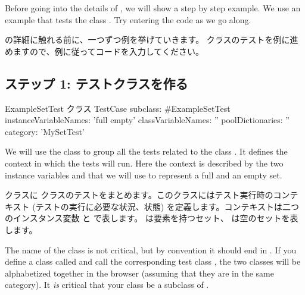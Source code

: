 \documentclass[a4paper,10pt,twoside]{book}
\begin{document}
Before going into the details of \SUnit, we will show a step by step
example.  We use an example that tests the class .  Try
entering the code as we go along.

\SUnit の詳細に触れる前に、一つずつ例を挙げていきます。  クラスのテストを例に進めますので、例に従ってコードを入力してください。

\subsection{ステップ 1: テストクラスを作る}

\fi


\begin{classdef}[exampleSetTest]{ExampleSetTest クラス}
TestCase subclass: #ExampleSetTest
	instanceVariableNames: 'full empty'
	classVariableNames: ''
	poolDictionaries: ''
	category: 'MySetTest'
\end{classdef}

We will use the class  to group all the tests related to
the class .  It defines the context in which the tests
will run.  Here the context is described by
the two instance variables  and 
that we will use to represent a full and an empty set.
\fi

 クラスに  クラスのテストをまとめます。このクラスにはテスト実行時のコンテキスト (テストの実行に必要な状況、状態) を定義します。コンテキストは二つのインスタンス変数  と  で表します。  は要素を持つセット、  は空のセットを表します。

The name of the class is not critical, but by convention it should end in .
If you define a class called  and call the corresponding test class , the two classes will be alphabetized together in the browser (assuming that they are in the same category).  It \emph{is} critical that your class be a subclass of .
\fi
\end{document}
